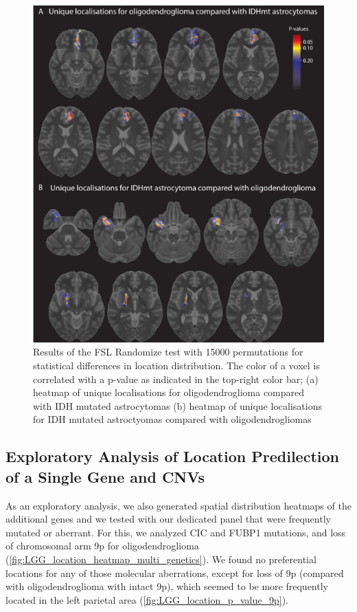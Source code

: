 \begin{figure}[htbp]
    \centering
    \includegraphics[width=\textwidth]{Figures/p_value_oligo_astro.png}
    \caption{Results of the FSL Randomize test with 15000 permutations for statistical
    differences in location distribution. The color of a voxel is correlated with
    a p-value as indicated in the top-right color bar; (a) heatmap of unique
    localisations for oligodendroglioma compared with IDH mutated astrocytomas (b) heatmap of unique localisations for IDH mutated astroctyomas
    compared with oligodendrogliomas}\label{fig:LGG_location_oligo_astro_p_value}
\end{figure}


\subsection{Exploratory Analysis of Location Predilection of a Single Gene and CNVs}

As an exploratory analysis, we also generated spatial distribution heatmaps of the additional genes and  we tested with our dedicated  panel that were frequently mutated or aberrant.
For this, we analyzed CIC and FUBP1 mutations, and loss of chromosomal arm 9p for oligodendroglioma (\cref{fig:LGG_location_heatmap_multi_genetics}).
We found no preferential locations for any of those molecular aberrations, except for loss of 9p (compared with oligodendroglioma with intact 9p), which seemed to be more frequently located in the left parietal area (\cref{fig:LGG_location_p_value_9p}).

